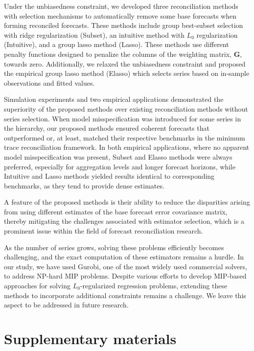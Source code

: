 \documentclass[
  11pt]{article}
\theoremstyle{plain}
\theoremstyle{remark}
\begin{document}
Under the unbiasedness constraint, we developed three reconciliation
methods with selection mechanisms to automatically remove some base
forecasts when forming reconciled forecasts. These methods include group
best-subset selection with ridge regularization (Subset), an intuitive
method with \(L_0\) regularization (Intuitive), and a group lasso method
(Lasso). These methods use different penalty functions designed to
penalize the columns of the weighting matrix, \(\bm{G}\), towards zero.
Additionally, we relaxed the unbiasedness constraint and proposed the
empirical group lasso method (Elasso) which selects series based on
in-sample observations and fitted values.

Simulation experiments and two empirical applications demonstrated the
superiority of the proposed methods over existing reconciliation methods
without series selection. When model misspecification was introduced for
some series in the hierarchy, our proposed methods ensured coherent
forecasts that outperformed or, at least, matched their respective
benchmarks in the minimum trace reconciliation framework. In both
empirical applications, where no apparent model misspecification was
present, Subset and Elasso methods were always preferred, especially for
aggregation levels and longer forecast horizons, while Intuitive and
Lasso methods yielded results identical to corresponding benchmarks, as
they tend to provide dense estimates.

A feature of the proposed methods is their ability to reduce the
disparities arising from using different estimates of the base forecast
error covariance matrix, thereby mitigating the challenges associated
with estimator selection, which is a prominent issue within the field of
forecast reconciliation research.

As the number of series grows, solving these problems efficiently
becomes challenging, and the exact computation of these estimators
remains a hurdle. In our study, we have used Gurobi, one of the most
widely used commercial solvers, to address NP-hard MIP problems. Despite
various efforts to develop MIP-based approaches for solving
\(L_0\)-regularized regression problems, extending these methods to
incorporate additional constraints remains a challenge. We leave this
aspect to be addressed in future research.

\section*{Supplementary materials}\label{supplementary-materials}
\end{document}
